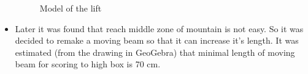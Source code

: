 \begin{itemize}
\begin{figure}[H]
\begin{minipage}[h]{0.6\linewidth}
		\caption{Model of the lift}
	\end{minipage}
\end{figure}

\item Later it was found that reach middle zone of mountain is not easy. So it was decided to remake a moving beam so that it can increase it's length. It was estimated (from the drawing in GeoGebra) that minimal length of moving beam for scoring to high box is 70 cm.


\end{itemize}
